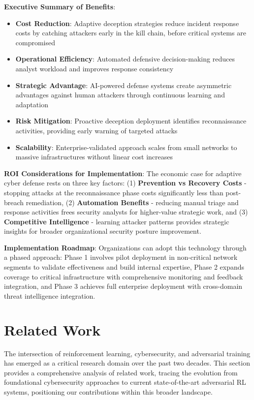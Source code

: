 \documentclass[12pt,twoside]{article}
\newcounter{phase}[algorithm]
\theoremstyle{definition}
\theoremstyle{plain}
\begin{document}
\textbf{Executive Summary of Benefits}:
\begin{itemize}
    \item \textbf{Cost Reduction}: Adaptive deception strategies reduce incident response costs by catching attackers early in the kill chain, before critical systems are compromised
    \item \textbf{Operational Efficiency}: Automated defensive decision-making reduces analyst workload and improves response consistency
    \item \textbf{Strategic Advantage}: AI-powered defense systems create asymmetric advantages against human attackers through continuous learning and adaptation
    \item \textbf{Risk Mitigation}: Proactive deception deployment identifies reconnaissance activities, providing early warning of targeted attacks
    \item \textbf{Scalability}: Enterprise-validated approach scales from small networks to massive infrastructures without linear cost increases
\end{itemize}

\textbf{ROI Considerations for Implementation}:
The economic case for adaptive cyber defense rests on three key factors: (1) \textbf{Prevention vs Recovery Costs} - stopping attacks at the reconnaissance phase costs significantly less than post-breach remediation, (2) \textbf{Automation Benefits} - reducing manual triage and response activities frees security analysts for higher-value strategic work, and (3) \textbf{Competitive Intelligence} - learning attacker patterns provides strategic insights for broader organizational security posture improvement.

\textbf{Implementation Roadmap}:
Organizations can adopt this technology through a phased approach: Phase 1 involves pilot deployment in non-critical network segments to validate effectiveness and build internal expertise, Phase 2 expands coverage to critical infrastructure with comprehensive monitoring and feedback integration, and Phase 3 achieves full enterprise deployment with cross-domain threat intelligence integration.

\section{Related Work}

The intersection of reinforcement learning, cybersecurity, and adversarial training has emerged as a critical research domain over the past two decades. This section provides a comprehensive analysis of related work, tracing the evolution from foundational cybersecurity approaches to current state-of-the-art adversarial RL systems, positioning our contributions within this broader landscape.
\end{document}
